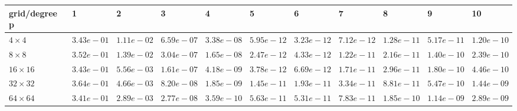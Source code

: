 \begin{tabular}{lllllllllll}
\hline
 grid/degree p   & 1          & 2          & 3          & 4          & 5          & 6          & 7          & 8          & 9          & 10         \\
\hline
 $4 \times 4$    & $3.43e-01$ & $1.11e-02$ & $6.59e-07$ & $3.38e-08$ & $5.95e-12$ & $3.23e-12$ & $7.12e-12$ & $1.28e-11$ & $5.17e-11$ & $1.20e-10$ \\
 $8 \times 8$    & $3.52e-01$ & $1.39e-02$ & $3.04e-07$ & $1.65e-08$ & $2.47e-12$ & $4.33e-12$ & $1.22e-11$ & $2.16e-11$ & $1.40e-10$ & $2.39e-10$ \\
 $16 \times 16$  & $3.43e-01$ & $5.56e-03$ & $1.61e-07$ & $4.18e-09$ & $3.78e-12$ & $6.69e-12$ & $1.71e-11$ & $2.96e-11$ & $1.80e-10$ & $4.46e-10$ \\
 $32 \times 32$  & $3.64e-01$ & $4.66e-03$ & $8.20e-08$ & $1.85e-09$ & $1.45e-11$ & $1.93e-11$ & $3.34e-11$ & $8.81e-11$ & $5.47e-10$ & $1.44e-09$ \\
 $64 \times 64$  & $3.41e-01$ & $2.89e-03$ & $2.77e-08$ & $3.59e-10$ & $5.63e-11$ & $5.31e-11$ & $7.83e-11$ & $1.85e-10$ & $1.14e-09$ & $2.89e-09$ \\
\hline
\end{tabular}